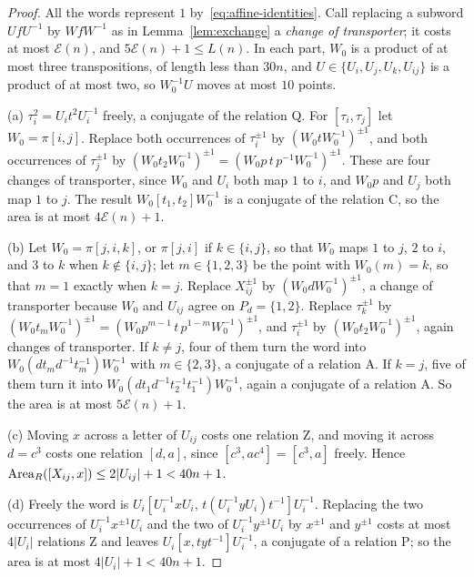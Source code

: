 \begin{proof}
All the words represent $1$ by~\eqref{eq:affine-identities}. Call replacing a subword $UfU^{-1}$ by $WfW^{-1}$ as in Lemma~\ref{lem:exchange} a
\emph{change of transporter}; it costs at most $\mathcal E(n)$, and $5\mathcal E(n)+1\le L(n)$. In each part, $W_0$ is a product of at most three
transpositions, of length less than $30n$, and $U\in\{U_i,U_j,U_k,U_{ij}\}$ is a product of at most two, so $W_0^{-1}U$ moves at most $10$ points.

(a) $\tau_i^2=U_it^2U_i^{-1}$ freely, a conjugate of the relation \textsf{Q}. For $[\tau_i,\tau_j]$ let $W_0=\pi[i,j]$. Replace both occurrences
of $\tau_i^{\pm1}$ by $(W_0tW_0^{-1})^{\pm1}$, and both occurrences of $\tau_j^{\pm1}$ by $(W_0t_2W_0^{-1})^{\pm1}=(W_0p\,t\,p^{-1}W_0^{-1})^{\pm1}$.
These are four changes of transporter, since $W_0$ and $U_i$ both map $1$ to $i$, and $W_0p$ and $U_j$ both map $1$ to $j$. The result
$W_0[t_1,t_2]W_0^{-1}$ is a conjugate of the relation \textsf{C}, so the area is at most $4\mathcal E(n)+1$.

(b) Let $W_0=\pi[j,i,k]$, or $\pi[j,i]$ if $k\in\{i,j\}$, so that $W_0$ maps $1$ to $j$, $2$ to $i$, and $3$ to $k$ when $k\notin\{i,j\}$; let
$m\in\{1,2,3\}$ be the point with $W_0(m)=k$, so that $m=1$ exactly when $k=j$. Replace $X_{ij}^{\pm1}$ by $(W_0dW_0^{-1})^{\pm1}$, a change of
transporter because $W_0$ and $U_{ij}$ agree on $P_d=\{1,2\}$. Replace $\tau_k^{\pm1}$ by $(W_0t_mW_0^{-1})^{\pm1}=(W_0p^{m-1}\,t\,p^{1-m}W_0^{-1})^{\pm1}$,
and $\tau_i^{\pm1}$ by $(W_0t_2W_0^{-1})^{\pm1}$, again changes of transporter. If $k\ne j$, four of them turn the word into
$W_0(dt_md^{-1}t_m^{-1})W_0^{-1}$ with $m\in\{2,3\}$, a conjugate of a relation \textsf{A}. If $k=j$, five of them turn it into
$W_0(dt_1d^{-1}t_2^{-1}t_1^{-1})W_0^{-1}$, again a conjugate of a relation \textsf{A}. So the area is at most $5\mathcal E(n)+1$.

(c) Moving $x$ across a letter of $U_{ij}$ costs one relation \textsf{Z}, and moving it across $d=c^3$ costs one relation $[d,a]$, since
$[c^3,ac^4]=[c^3,a]$ freely. Hence $\operatorname{Area}_R([X_{ij},x])\le2|U_{ij}|+1<40n+1$.

(d) Freely the word is $U_i[U_i^{-1}xU_i,\,t(U_i^{-1}yU_i)t^{-1}]U_i^{-1}$. Replacing the two occurrences of $U_i^{-1}x^{\pm1}U_i$ and the two of
$U_i^{-1}y^{\pm1}U_i$ by $x^{\pm1}$ and $y^{\pm1}$ costs at most $4|U_i|$ relations \textsf{Z} and leaves $U_i[x,tyt^{-1}]U_i^{-1}$, a conjugate of a
relation \textsf{P}; so the area is at most $4|U_i|+1<40n+1$.
\end{proof}
